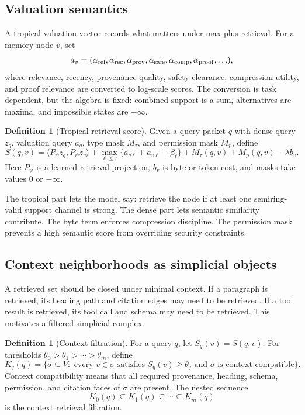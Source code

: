 \documentclass[11pt]{article}
\theoremstyle{definition}
\newtheorem{definition}[theorem]{Definition}
\theoremstyle{remark}
\begin{document}
\subsection{Valuation semantics}

A tropical valuation vector records what matters under max-plus retrieval. For a memory node \(v\), set
\[
    a_v = (\alpha_{\rm rel},\alpha_{\rm rec},\alpha_{\rm prov},\alpha_{\rm safe},\alpha_{\rm comp},\alpha_{\rm proof},\ldots),
\]
where relevance, recency, provenance quality, safety clearance, compression utility, and proof relevance are converted to log-scale scores. The conversion is task dependent, but the algebra is fixed: combined support is a sum, alternatives are maxima, and impossible states are \(-\infty\).

\begin{definition}[Tropical retrieval score]
Given a query packet \(q\) with dense query \(z_q\), valuation query \(a_q\), type mask \(M_\tau\), and permission mask \(M_p\), define
\[
    S(q,v)=\langle P_\psi z_q, P_\psi z_v\rangle + \max_{\ell\le r}\{a_{q\ell}+a_{v\ell}+\beta_\ell\}+M_\tau(q,v)+M_p(q,v)-\lambda b_v.
\]
Here \(P_\psi\) is a learned retrieval projection, \(b_v\) is byte or token cost, and masks take values \(0\) or \(-\infty\).
\end{definition}

The tropical part lets the model say: retrieve the node if at least one semiring-valid support channel is strong. The dense part lets semantic similarity contribute. The byte term enforces compression discipline. The permission mask prevents a high semantic score from overriding security constraints.

\subsection{Context neighborhoods as simplicial objects}

A retrieved set should be closed under minimal context. If a paragraph is retrieved, its heading path and citation edges may need to be retrieved. If a tool result is retrieved, its tool call and schema may need to be retrieved. This motivates a filtered simplicial complex.

\begin{definition}[Context filtration]
For a query \(q\), let \(S_q(v)=S(q,v)\). For thresholds \(\theta_0>\theta_1>\cdots>\theta_m\), define
\[
    K_j(q)=\{\sigma\subseteq V: \text{ every }v\in\sigma\text{ satisfies }S_q(v)\ge\theta_j\text{ and }\sigma\text{ is context-compatible}\}.
\]
Context compatibility means that all required provenance, heading, schema, permission, and citation faces of \(\sigma\) are present. The nested sequence
\[
    K_0(q)\subseteq K_1(q)\subseteq\cdots\subseteq K_m(q)
\]
is the context retrieval filtration.
\end{definition}
\end{document}
